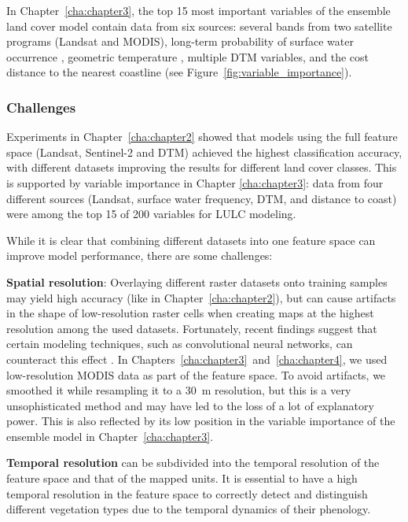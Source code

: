             In Chapter\@~\ref{cha:chapter3}, the top 15 most important variables of the ensemble land cover model contain data from six sources: several bands from two satellite programs (Landsat and MODIS), long-term probability of surface water occurrence \citep{pekel2016high}, geometric temperature \citep{kilibarda2014spatio}, multiple DTM variables, and the cost distance to the nearest coastline (see Figure~\ref{fig:variable_importance}). 
    
        \subsubsection{Challenges}
            
            Experiments in Chapter\@~\ref{cha:chapter2} showed that models using the full feature space (Landsat, Sentinel-2 and DTM) achieved the highest classification accuracy, with different datasets improving the results for different land cover classes. This is supported by variable importance in Chapter \ref{cha:chapter3}: data from four different sources (Landsat, surface water frequency, DTM, and distance to coast) were among the top 15 of 200 variables for LULC modeling.
            
            While it is clear that combining different datasets into one feature space can improve model performance, there are some challenges:
    
            \textbf{Spatial resolution}: Overlaying different raster datasets onto training samples may yield high accuracy (like in Chapter\@~\ref{cha:chapter2}), but can cause artifacts in the shape of low-resolution raster cells when creating maps at the highest resolution among the used datasets. Fortunately, recent findings suggest that certain modeling techniques, such as convolutional neural networks, can counteract this effect \citep{robinson2019large}. In Chapters\@~\ref{cha:chapter3}\@~and\@~\ref{cha:chapter4}, we used low-resolution MODIS data as part of the feature space. To avoid artifacts, we smoothed it while resampling it to a 30~m resolution, but this is a very unsophisticated method and may have led to the loss of a lot of explanatory power. This is also reflected by its low position in the variable importance of the ensemble model in Chapter\@~\ref{cha:chapter3}.

            \textbf{Temporal resolution} can be subdivided into the temporal resolution of the feature space and that of the mapped units. It is essential to have a high temporal resolution in the feature space to correctly detect and distinguish different vegetation types due to the temporal dynamics of their phenology. 
            
